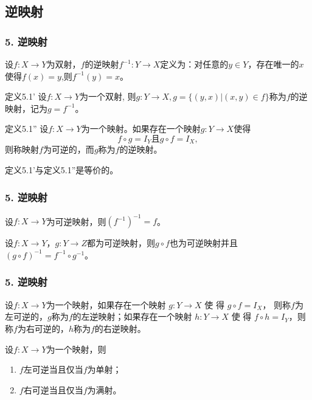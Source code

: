 \documentclass{beamer}
\begin{document}
\begin{CJK*}{UTF8}{gbsn}
\section{逆映射}
\begin{frame}
  \frametitle{5. 逆映射}
  \begin{Def}
     设$f:X\to Y$为双射，$f$的\alert{逆映射}$f^{-1}:Y\to X$定义为：对任意的$y\in Y$，存在唯一的$x$使得$f(x)=y$,则$f^{-1}(y)=x$。
   \end{Def}
   \pause
     \begin{block}{定义5.1'}
     设$f:X\to Y$为一个双射, 则$g:Y\to X, g=\{(y,x)|(x,y)\in f\}$称为$f$的逆映射，记为$g=f^{-1}$。
   \end{block}
        \begin{block}{定义5.1''}
     设$f:X\to Y$为一个映射。如果存在一个映射$g:Y\to X$使得\[f\circ g = I_{Y} \text{且} g\circ f = I_{X},\]则称映射$f$为可逆的，而$g$称为$f$的\alert{逆映射}。
   \end{block}

   \begin{Thm}
     定义5.1'与定义5.1''是等价的。
   \end{Thm}
\end{frame}
\begin{frame}
  \frametitle{5. 逆映射}
  \begin{Thm}
    设$f:X\to Y$为可逆映射，则$(f^{-1})^{-1}=f$。
  \end{Thm}
  \pause
  \begin{Thm}
    设$f:X\to Y$，$g:Y\to Z$都为可逆映射，则$g\circ f$也为可逆映射并且$(g\circ f)^{-1} = f^{-1}\circ g^{-1}$。
  \end{Thm}
\end{frame}
\begin{frame}
  \frametitle{5. 逆映射}
  \begin{Def}\justifying\let\raggedright\justifying
    设$f:X\to Y$为一个映射，如果存在一个映射 $g:Y\to X$ 使 得 $g\circ f = I_X$，
    则称$f$为\alert{左可逆}的，$g$称为$f$的\alert{左逆映射}；如果存在一个映射
    $h:Y\to X$ 使 得 $f\circ h=I_Y$，则称$f$为\alert{右可逆}的，$h$称为$f$的\alert{右逆映射}。
  \end{Def}\pause
  \begin{Thm}
    设$f:X\to Y$为一个映射，则
    \begin{enumerate}
    \item $f$左可逆当且仅当$f$为单射；
    \item $f$右可逆当且仅当$f$为满射。
    \end{enumerate}
  \end{Thm}
\end{frame}

\end{CJK*}
\end{document}
